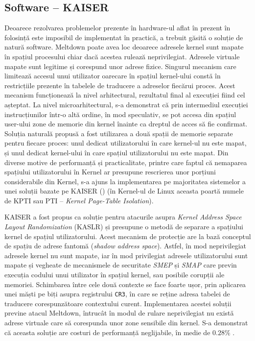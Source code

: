 \subsection{Software -- KAISER}

Deoarece rezolvarea problemelor prezente în hardware-ul aflat în prezent în
folosință este imposibil de implementat în practică, a trebuit găsită o soluție
de natură software. Meltdown poate avea loc deoarece adresele kernel sunt mapate
în spațiul procesului chiar dacă acestea rulează neprivilegiat. Adresele
virtuale mapate sunt legitime și corespund unor adrese fizice. Singurul
mecanism care limitează accesul unui utilizator oarecare în spațiul kernel-ului
constă în restricțiile prezente în tabelele de traducere a adreselor fiecărui
proces. Acest mecanism funcționează la nivel arhitectural, rezultatul final al
execuției fiind cel așteptat. La nivel microarhitectural, s-a demonstrat că
prin intermediul execuției instrucțiunilor într-o altă ordine, în mod
speculativ, se pot accesa din spațiul user-ului zone de memorie din kernel
înainte ca dreptul de acces să fie confirmat. Soluția naturală propusă a fost
utilizarea a două spații de memorie separate pentru fiecare proces: unul
dedicat utilizatorului în care kernel-ul nu este mapat, și unul dedicat
kernel-ului în care spațiul utilizatorului nu este mapat. Din diverse motive de
performanță și practicalitate, printre care faptul că nemaparea spațiului
utilizatorului în Kernel ar presupune rescrierea unor porțiuni considerabile
din Kernel, s-a ajuns la implementarea pe majoritatea sistemelor a unei soluții
bazate pe KAISER (\cite{gruss2017kaslr}) (în Kernel-ul de Linux aceasta poartă
numele de KPTI sau PTI -- \emph{Kernel Page-Table Isolation}).

KAISER a fost propus ca soluție pentru atacurile asupra \emph{Kernel Address
Space Layout Randomization} (KASLR) și presupune o metodă de separare a
spațiului kernel de spațiul utilizatorului. Acest mecanism de protecție are la
bază conceptul de spațiu de adrese fantomă (\emph{shadow address space}).
Astfel, în mod neprivilegiat adresele kernel nu sunt mapate, iar în mod
privilegiat adresele utilizatorului sunt mapate și vegheate de mecanismele de
securitate \emph{SMEP} și \emph{SMAP} care previn execuția codului unui
utilizator în spațiul kernel, sau posibile corupții ale memoriei. Schimbarea
între cele două contexte se face foarte ușor, prin aplicarea unei măști pe biți
asupra registrului \texttt{CR3}, în care se reține adresa tabelei de traducere
corespunzătoare contextului curent. Implementarea acestei soluții previne
atacul Meltdown, întrucât în modul de rulare neprivilegiat nu există adrese
virtuale care să corespunda unor zone sensibile din kernel. S-a demonstrat
că aceasta soluție are costuri de performanță neglijabile, în medie de $0.28\%$
\cite{gruss2017kaslr}.

